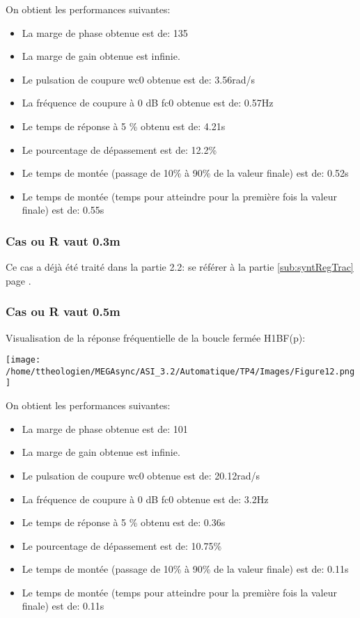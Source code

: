 \documentclass[a4paper,12pt]{article}
\begin{document}
				\par On obtient les performances suivantes:
				\begin{itemize}
					\item La marge de phase obtenue est de: 135\degre
					\item La marge de gain obtenue est infinie.
					\item Le pulsation de coupure wc0 obtenue est de: 3.56rad/s
					\item La fréquence de coupure à 0 dB fc0 obtenue est de: 0.57Hz
					\item Le temps de réponse à 5 \% obtenu est de: 4.21s
					\item Le pourcentage de dépassement est de: 12.2\%
					\item Le temps de montée (passage de 10\% à 90\% de la valeur finale) est de: 0.52s
					\item Le temps de montée (temps pour atteindre pour la première fois la valeur finale) est de: 0.55s\\
				\end{itemize}
				\pagebreak

			\subsubsection{Cas ou R vaut 0.3m}
				\par Ce cas a déjà été traité dans la partie 2.2: se référer à la partie \ref{sub:syntRegTrac} page \pageref{sub:syntRegTrac}.

			\subsubsection{Cas ou R vaut 0.5m}
				\par Visualisation de la réponse fréquentielle de la boucle fermée H1BF(p):
				\begin{center}
					\texttt{[image: /home/ttheologien/MEGAsync/ASI\_3.2/Automatique/TP4/Images/Figure12.png]}
				\end{center}

				\par On obtient les performances suivantes:
				\begin{itemize}
					\item La marge de phase obtenue est de: 101\degre
					\item La marge de gain obtenue est infinie.
					\item Le pulsation de coupure wc0 obtenue est de: 20.12rad/s
					\item La fréquence de coupure à 0 dB fc0 obtenue est de: 3.2Hz
					\item Le temps de réponse à 5 \% obtenu est de: 0.36s
					\item Le pourcentage de dépassement est de: 10.75\%
					\item Le temps de montée (passage de 10\% à 90\% de la valeur finale) est de: 0.11s
					\item Le temps de montée (temps pour atteindre pour la première fois la valeur finale) est de: 0.11s\\
				\end{itemize}
				\pagebreak
\end{document}
